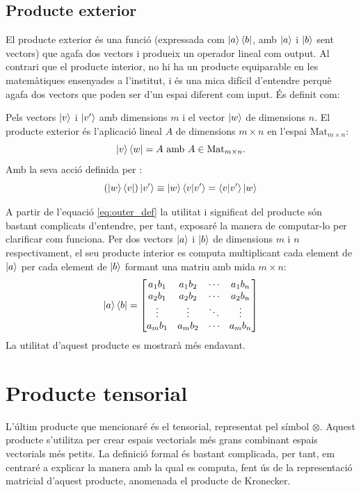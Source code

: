 \subsection{Producte exterior}
El producte exterior és una funció (expressada com $\ket{a}\bra{b}$, amb $\ket{a}$ i $\ket{b}$ sent vectors) que agafa dos vectors i produeix un operador lineal com output. Al contrari que el producte interior, no hi ha un producte equiparable en les matemàtiques ensenyades a l'institut, i és una mica difícil d'entendre perquè agafa dos vectors que poden ser d'un espai diferent com input. És definit com:

Pels vectors $\ket{v}$ i $\ket{v'}$ amb dimensions $m$ i el vector $\ket{w}$ de dimensions $n$. El producte exterior és l'aplicació lineal $A$ de dimensions $m \times n$ en l'espai $\mathrm{Mat}_{m\times n}$:
$$
\ket{v}\bra{w} = A \text{ amb } A\in \mathrm{Mat}_{m\times n} .
$$ 
Amb la seva acció definida per \cite{QCandQI:inner}: 
\begin{equation}
	(\ket{w}\bra{v})\ket{v'} \equiv \ket{w}\bra{v}\ket{v'} = \bra{v}\ket{v'}\ket{w}
	\label{eq:outer_def}
\end{equation}

A partir de l'equació \eqref{eq:outer_def} la utilitat i significat del producte són bastant complicats d'entendre, per tant, exposaré la manera de computar-lo per clarificar com funciona. Per dos vectors $\ket{a}$ i $\ket{b}$ de dimensions $m$ i $n$ respectivament, el seu producte interior es computa multiplicant cada element de $\ket{a}$ per cada element de $\ket{b}$ formant una matriu amb mida $m\times n$:
$$
\ket{a}\bra{b} = \begin{bmatrix}
	a_1 b_1 & a_1 b_2 & \cdots & a_1 b_n \\
	a_2 b_1 & a_2 b_2 & \cdots & a_2 b_n \\
	\vdots  & \vdots  & \ddots& \vdots  \\
	a_m b_1 & a_m b_2 & \cdots & a_m b_n \\
\end{bmatrix}
$$
La utilitat d'aquest producte es mostrarà més endavant.

\section{Producte tensorial}
L'últim producte que mencionaré és el tensorial, representat pel símbol $\otimes$. Aquest producte s'utilitza per crear espais vectorials més grans combinant espais vectorials més petits. La definició formal és bastant complicada, per tant, em centraré a explicar la manera amb la qual es computa, fent ús de la representació matricial d'aquest producte, anomenada el producte de Kronecker.
\vspace{11cm}

